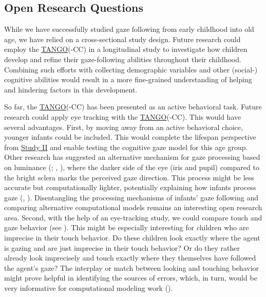 \documentclass[
]{scrbook}
\begin{document}
\subsection{Open Research Questions}\label{outlook-questions}

While we have successfully studied gaze following from early childhood into old age, we have relied on a cross-sectional study design. Future research could employ the \hyperref[acronyms_TANGO]{TANGO}(-CC) in a longitudinal study to investigate how children develop and refine their gaze-following abilities throughout their childhood. Combining such efforts with collecting demographic variables and other (social-) cognitive abilities would result in a more fine-grained understanding of helping and hindering factors in this development.

So far, the \hyperref[acronyms_TANGO]{TANGO}(-CC) has been presented as an active behavioral task. Future research could apply eye tracking with the \hyperref[acronyms_TANGO]{TANGO}(-CC). This would have several advantages. First, by moving away from an active behavioral choice, younger infants could be included. This would complete the lifespan perspective from \hyperref[studyII]{Study II} and enable testing the cognitive gaze model for this age group. Other research has suggested an alternative mechanism for gaze processing based on luminance (; , ), where the darker side of the eye (iris and pupil) compared to the bright sclera marks the perceived gaze direction. This process might be less accurate but computationally lighter, potentially explaining how infants process gaze (, ). Disentangling the processing mechanisms of infants' gaze following and comparing alternative computational models remains an interesting open research area. Second, with the help of an eye-tracking study, we could compare touch and gaze behavior (see ). This might be especially interesting for children who are imprecise in their touch behavior. Do these children look exactly where the agent is gazing and are just imprecise in their touch behavior? Or do they rather already look imprecisely and touch exactly where they themselves have followed the agent's gaze? The interplay or match between looking and touching behavior might prove helpful in identifying the sources of errors, which, in turn, would be very informative for computational modeling work ().
\end{document}
